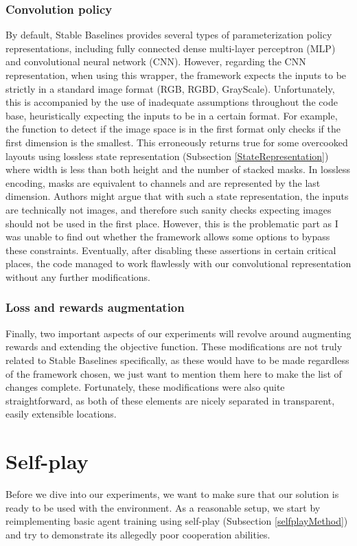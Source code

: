 \subsubsection*{Convolution policy}
By default, Stable Baselines provides several types of parameterization policy representations, including fully connected dense multi-layer perceptron (MLP) and convolutional neural network (CNN).
However, regarding the CNN representation, when using this wrapper, the framework expects the inputs to be strictly in a standard image format (RGB, RGBD, GrayScale).
Unfortunately, this is accompanied by the use of inadequate assumptions throughout the code base, heuristically expecting the inputs to be in a certain format.
For example, the function to detect if the image space is in the first format only checks if the first dimension is the smallest.
This erroneously returns true for some overcooked layouts using lossless state representation (Subsection \ref{StateRepresentation}) where width is less than both height and the number of stacked masks.
In lossless encoding, masks are equivalent to channels and are represented by the last dimension.
Authors might argue that with such a state representation, the inputs are technically not images, and therefore such sanity checks expecting images should not be used in the first place.
However, this is the problematic part as I was unable to find out whether the framework allows some options to bypass these constraints.
Eventually, after disabling these assertions in certain critical places, the code managed to work flawlessly with our convolutional representation without any further modifications.

\subsubsection*{Loss and rewards augmentation}
Finally, two important aspects of our experiments will revolve around augmenting rewards and extending the objective function.
These modifications are not truly related to Stable Baselines specifically, as these would have to be made regardless of the framework chosen, we just want to mention them here to make the list of changes complete. 
Fortunately, these modifications were also quite straightforward, as both of these elements are nicely separated in transparent, easily extensible locations.

\section{Self-play}
Before we dive into our experiments, we want to make sure that our solution is ready to be used with the environment.
As a reasonable setup, we start by reimplementing basic agent training using self-play (Subsection \ref{selfplayMethod}) and try to demonstrate its allegedly poor cooperation abilities.



